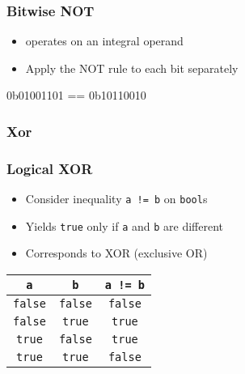 \begin{frame}
  \frametitle{Bitwise NOT}
  \begin{itemize}
    \item \texttt{\NOT} operates on an integral operand
    \item Apply the NOT rule to each bit separately
  \end{itemize}
  \begin{center}
  \end{center}
  \vskip2mm
  \begin{center} \ttfamily
    \NOT 0b01001101 == 0b10110010
  \end{center}
\end{frame}

\subsubsection{Xor}
\frame{\tableofcontents[currentsubsection]}

\begin{frame}
  \frametitle{Logical XOR}
  \begin{itemize}
    \item Consider inequality \texttt{a != b} on \texttt{bool}s
    \item Yields \texttt{true} only if \texttt{a} and \texttt{b} are different
    \item Corresponds to XOR (exclusive OR)
  \end{itemize}
  \begin{center}
    \begin{tabular}{ccc}
      \toprule
      \texttt{a} & \texttt{b} & \texttt{a != b} \\
      \midrule
      \texttt{false} & \texttt{false} & \texttt{false} \\
      \texttt{false} & \texttt{true} & \texttt{true} \\
      \texttt{true} & \texttt{false} & \texttt{true} \\
      \texttt{true} & \texttt{true} & \texttt{false} \\
      \bottomrule
    \end{tabular}
  \end{center}
\end{frame}

